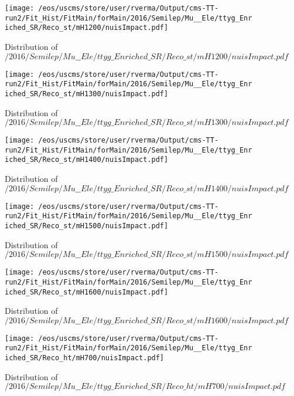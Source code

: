 \begin{figure}
\centering
\texttt{[image: /eos/uscms/store/user/rverma/Output/cms-TT-run2/Fit\_Hist/FitMain/forMain/2016/Semilep/Mu\_\_Ele/ttyg\_Enriched\_SR/Reco\_st/mH1200/nuisImpact.pdf]}
\caption{Distribution of $/2016/Semilep/Mu\_\_Ele/ttyg\_Enriched\_SR/Reco\_st/mH1200/nuisImpact.pdf$}
\end{figure}

\begin{figure}
\centering
\texttt{[image: /eos/uscms/store/user/rverma/Output/cms-TT-run2/Fit\_Hist/FitMain/forMain/2016/Semilep/Mu\_\_Ele/ttyg\_Enriched\_SR/Reco\_st/mH1300/nuisImpact.pdf]}
\caption{Distribution of $/2016/Semilep/Mu\_\_Ele/ttyg\_Enriched\_SR/Reco\_st/mH1300/nuisImpact.pdf$}
\end{figure}

\begin{figure}
\centering
\texttt{[image: /eos/uscms/store/user/rverma/Output/cms-TT-run2/Fit\_Hist/FitMain/forMain/2016/Semilep/Mu\_\_Ele/ttyg\_Enriched\_SR/Reco\_st/mH1400/nuisImpact.pdf]}
\caption{Distribution of $/2016/Semilep/Mu\_\_Ele/ttyg\_Enriched\_SR/Reco\_st/mH1400/nuisImpact.pdf$}
\end{figure}

\begin{figure}
\centering
\texttt{[image: /eos/uscms/store/user/rverma/Output/cms-TT-run2/Fit\_Hist/FitMain/forMain/2016/Semilep/Mu\_\_Ele/ttyg\_Enriched\_SR/Reco\_st/mH1500/nuisImpact.pdf]}
\caption{Distribution of $/2016/Semilep/Mu\_\_Ele/ttyg\_Enriched\_SR/Reco\_st/mH1500/nuisImpact.pdf$}
\end{figure}

\begin{figure}
\centering
\texttt{[image: /eos/uscms/store/user/rverma/Output/cms-TT-run2/Fit\_Hist/FitMain/forMain/2016/Semilep/Mu\_\_Ele/ttyg\_Enriched\_SR/Reco\_st/mH1600/nuisImpact.pdf]}
\caption{Distribution of $/2016/Semilep/Mu\_\_Ele/ttyg\_Enriched\_SR/Reco\_st/mH1600/nuisImpact.pdf$}
\end{figure}

\begin{figure}
\centering
\texttt{[image: /eos/uscms/store/user/rverma/Output/cms-TT-run2/Fit\_Hist/FitMain/forMain/2016/Semilep/Mu\_\_Ele/ttyg\_Enriched\_SR/Reco\_ht/mH700/nuisImpact.pdf]}
\caption{Distribution of $/2016/Semilep/Mu\_\_Ele/ttyg\_Enriched\_SR/Reco\_ht/mH700/nuisImpact.pdf$}
\end{figure}

